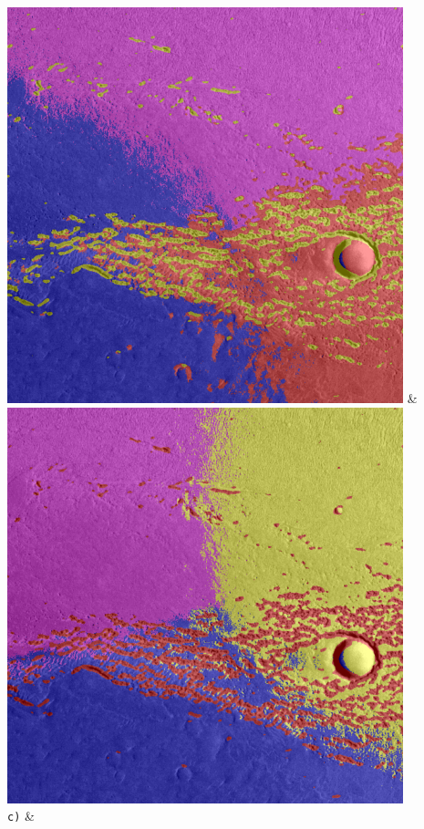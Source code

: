 \begin{table}[h!]
\begin{tabularx}{\textwidth}
		\includegraphics[width=0.9\linewidth]{images/gen/spatial_weight/p03_02.png_1.33.png} &
		\includegraphics[width=0.9\linewidth]{images/gen/spatial_weight/p03_02.png_1.66.png} \\
		\texttt{c)} &

\end{tabularx}
\end{table}
